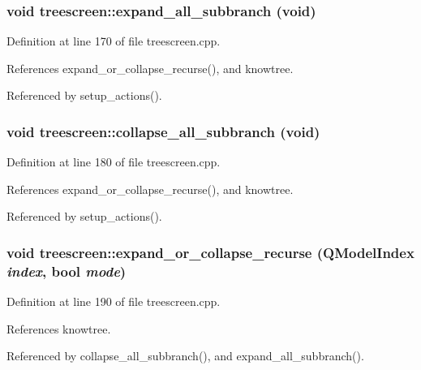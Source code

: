 \subsubsection{\setlength{\rightskip}{0pt plus 5cm}void treescreen::expand\_\-all\_\-subbranch (void)\hspace{0.3cm}{\tt  [private, slot]}}\label{classtreescreen_4fe3c8329879acf9f25b1f7c4751ff20}




Definition at line 170 of file treescreen.cpp.

References expand\_\-or\_\-collapse\_\-recurse(), and knowtree.

Referenced by setup\_\-actions().
\subsubsection{\setlength{\rightskip}{0pt plus 5cm}void treescreen::collapse\_\-all\_\-subbranch (void)\hspace{0.3cm}{\tt  [private, slot]}}\label{classtreescreen_c8bae82f6fd32b8af4f5a1c574e968e9}




Definition at line 180 of file treescreen.cpp.

References expand\_\-or\_\-collapse\_\-recurse(), and knowtree.

Referenced by setup\_\-actions().
\subsubsection{\setlength{\rightskip}{0pt plus 5cm}void treescreen::expand\_\-or\_\-collapse\_\-recurse (QModel\-Index {\em index}, bool {\em mode})\hspace{0.3cm}{\tt  [private, slot]}}\label{classtreescreen_bc30a814c261100adbc6a7d21acae930}




Definition at line 190 of file treescreen.cpp.

References knowtree.

Referenced by collapse\_\-all\_\-subbranch(), and expand\_\-all\_\-subbranch().
